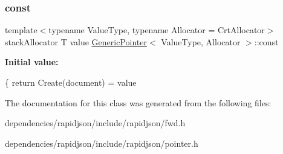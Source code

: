 \subsubsection{\texorpdfstring{const}{const}\hspace{0.1cm}{\footnotesize\ttfamily [3/3]}}
{\footnotesize\ttfamily template$<$typename Value\+Type, typename Allocator = Crt\+Allocator$>$ \\
stack\+Allocator T value \hyperlink{class_generic_pointer}{Generic\+Pointer}$<$ Value\+Type, Allocator $>$\+::const}

{\bfseries Initial value\+:}
\begin{DoxyCode}
\{
            \textcolor{keywordflow}{return} Create(document) = value
\end{DoxyCode}


The documentation for this class was generated from the following files\+:\begin{DoxyCompactItemize}
\item 
dependencies/rapidjson/include/rapidjson/fwd.\+h\item 
dependencies/rapidjson/include/rapidjson/pointer.\+h\end{DoxyCompactItemize}
